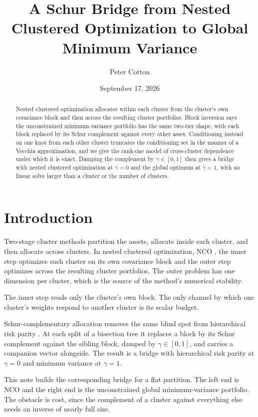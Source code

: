 \documentclass[11pt]{article}
\title{A Schur Bridge from Nested Clustered Optimization to Global Minimum
Variance}
\author{Peter Cotton}
\date{September 17, 2026}
\begin{document}
\maketitle

\begin{abstract}
Nested clustered optimization allocates within each cluster from the
cluster's own covariance block and then across the resulting cluster
portfolios. Block inversion says the unconstrained minimum-variance
portfolio has the same two-tier shape, with each block replaced by its Schur
complement against every other asset. Conditioning instead on one knot from each other cluster truncates the
conditioning set in the manner of a Vecchia approximation, and we give the rank-one model of cross-cluster dependence under which it is
exact. Damping the complement by $\gamma\in[0,1]$ then gives a bridge with
nested clustered optimization at $\gamma=0$ and the global optimum at
$\gamma=1$, with no linear solve larger than a cluster or the number of
clusters.
\end{abstract}

\section{Introduction}

Two-stage cluster methods partition the assets, allocate inside each
cluster, and then allocate across clusters. In nested clustered
optimization, NCO \parencite{lopezdeprado2020}, the inner step optimizes
each cluster on its own covariance block and the outer step optimizes across
the resulting cluster portfolios. The outer problem has one dimension per
cluster, which is the source of the method's numerical stability.

The inner step reads only the cluster's own block. The only channel by which
one cluster's weights respond to another cluster is its scalar budget.

Schur-complementary allocation \parencite{cotton2024schur} removes the same
blind spot from hierarchical risk parity \parencite{lopezdeprado2016}. At
each split of a bisection tree it replaces a block by its Schur complement
against the sibling block, damped by $\gamma\in[0,1]$, and carries a
companion vector alongside. The result is a bridge with hierarchical risk
parity at $\gamma=0$ and minimum variance at $\gamma=1$.

This note builds the corresponding bridge for a flat partition. The left
end is NCO and the right end is the unconstrained global minimum-variance
portfolio. The obstacle is cost, since the complement of a cluster against
everything else needs an inverse of nearly full size.
\end{document}
